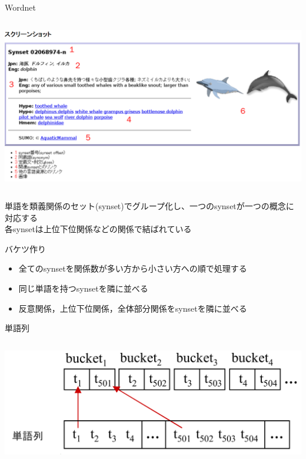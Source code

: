 \documentclass[14pt,xcolor=dvipsnames,table,dvipdfmx]{beamer}
\begin{document}
\begin{frame}{Wordnet}
\fontsize{12pt}{7.2}\selectfont
	\begin{columns}[t]
		\begin{column}{1.0\textwidth} %
			\includegraphics[width=\columnwidth]{photo14.png}
		\end{column}
	\end{columns}
	\begin{block}{}
		単語を類義関係のセット(synset)でグループ化し、一つのsynsetが一つの概念に対応する \\
		各synsetは上位下位関係などの関係で結ばれている
	\end{block}
\end{frame}

\begin{frame}{バケツ作り}
	\begin{block}{}
		\begin{itemize}
			\item 全てのsynsetを関係数が多い方から小さい方への順で処理する
			\item 同じ単語を持つsynsetを隣に並べる
			\item 反意関係，上位下位関係，全体部分関係をsynsetを隣に並べる
		\end{itemize}
	\end{block}
\end{frame}

\begin{frame}{単語列}
	\begin{columns}[t]
		\begin{column}{1.0\textwidth} %
			\includegraphics[width=\columnwidth]{rk11.png}
		\end{column}
	\end{columns}
\end{frame}
\end{document}
